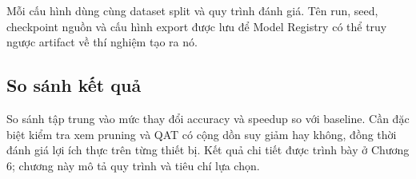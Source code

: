 Mỗi cấu hình dùng cùng dataset split và quy trình đánh giá. Tên run, seed,
checkpoint nguồn và cấu hình export được lưu để Model Registry có thể truy ngược
artifact về thí nghiệm tạo ra nó.

\subsection{So sánh kết quả}

So sánh tập trung vào mức thay đổi accuracy và speedup so với baseline. Cần đặc
biệt kiểm tra xem pruning và QAT có cộng dồn suy giảm hay không, đồng thời đánh
giá lợi ích thực trên từng thiết bị. Kết quả chi tiết được trình bày ở Chương 6;
chương này mô tả quy trình và tiêu chí lựa chọn.